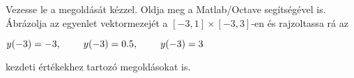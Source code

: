 Vezesse le a 
\de{} megoldását kézzel. 
Oldja meg a Matlab/Octave   segítségével is. 
Ábrázolja az egyenlet vektormezejét a $[-3,1]\times [-3,3]$-en és 
rajzoltassa rá az 
\centerline{$y(-3)=-3, \hspace{0.8cm} y(-3)=0.5, \hspace{0.8cm} y(-3)=3$}
kezdeti értékekhez tartozó megoldásokat is.


